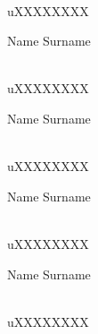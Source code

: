\documentclass[a4paper,12pt]{report}
\begin{document}
\begin{titlepage}
\begin{center}
\begin{minipage}{0.4\textwidth}
\end{minipage}
\begin{minipage}{0.4\textwidth}
\begin{flushright} \large
\emph{} \\
uXXXXXXXX
\end{flushright}
\end{minipage}
\begin{minipage}{0.4\textwidth}
\begin{flushleft} \large
Name {Surname}
\end{flushleft}
\end{minipage}
\begin{minipage}{0.4\textwidth}
\begin{flushright} \large
\emph{} \\
uXXXXXXXX
\end{flushright}
\end{minipage}
\begin{minipage}{0.4\textwidth}
\begin{flushleft} \large
Name {Surname}
\end{flushleft}
\end{minipage}
\begin{minipage}{0.4\textwidth}
\begin{flushright} \large
\emph{} \\
uXXXXXXXX
\end{flushright}
\end{minipage}
\begin{minipage}{0.4\textwidth}
\begin{flushleft} \large
Name {Surname}
\end{flushleft}
\end{minipage}
\begin{minipage}{0.4\textwidth}
\begin{flushright} \large
\emph{} \\
uXXXXXXXX
\end{flushright}
\end{minipage}
\begin{minipage}{0.4\textwidth}
\begin{flushleft} \large
Name {Surname}
\end{flushleft}
\end{minipage}
\begin{minipage}{0.4\textwidth}
\begin{flushright} \large
\emph{} \\
uXXXXXXXX
\end{flushright}

\end{minipage}
\end{center}
\end{titlepage}
\end{document}
